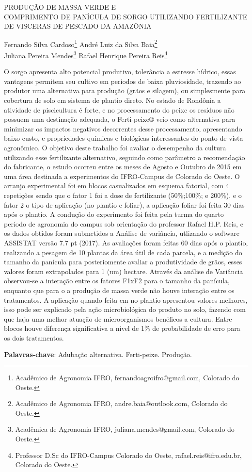 \documentclass[article,12pt,onesidea,4paper,english,brazil]{abntex2}
\begin{document}
	
	
	\frenchspacing 
	
	\begin{center}
		\LARGE PRODUÇÃO DE MASSA VERDE E \\COMPRIMENTO DE PANÍCULA DE SORGO
		UTILIZANDO FERTILIZANTE DE VISCERAS DE PESCADO DA AMAZÔNIA
		
		\normalsize
	Fernando Silva Cardoso\footnote{Acadêmico de Agronomia IFRO, fernandoagroifro@gmail.com, Colorado do Oeste.} 
	André Luiz da Silva Baia\footnote{Acadêmico de Agronomia IFRO, andre.baia@outlook.com, Colorado do Oeste.} \\
	Juliana Pereira Mendes\footnote{Acadêmica de Agronomia IFRO, juliana.mendes@gmail.com, Colorado do Oeste.} 
	Rafael Henrique Pereira Reis\footnote{Professor D.Sc do IFRO-Campus Colorado do Oeste, rafael.reis@ifro.edu.br, Colorado do Oeste.} 
	\end{center}
	
	\noindent O sorgo apresenta alto potencial produtivo, tolerância a estresse hídrico, essas
	vantagens permitem seu cultivo em períodos de baixa pluviosidade, trazendo ao
	produtor uma alternativa para produção (grãos e silagem), ou simplesmente para
	cobertura de solo em sistema de plantio direto. No estado de Rondônia a atividade
	de piscicultura é forte, e no processamento do peixe os resíduos não possuem uma
	destinação adequada, o Ferti-peixe® veio como alternativa para minimizar os
	impactos negativos decorrentes desse processamento, apresentando baixo custo, e
	propriedades químicas e biológicas interessantes do ponto de vista agronômico. O
	objetivo deste trabalho foi avaliar o desempenho da cultura utilizando esse
	fertilizante alternativo, seguindo como parâmetro a recomendação do fabricante, o
	estudo ocorreu entre os meses de Agosto e Outubro de 2015 em uma área
	destinada a experimentos do IFRO-Campus de Colorado do Oeste. O arranjo
	experimental foi em blocos casualizados em esquema fatorial, com 4 repetições
	sendo que o fator 1 foi a dose de fertilizante (50\%;100\%; e 200\%), e o fator 2 o tipo
	de aplicação (no plantio e foliar), a aplicação foliar foi feita 30 dias após o plantio. A
	condução do experimento foi feita pela turma do quarto período de agronomia do
	campus sob orientação do professor Rafael H.P. Reis, e os dados obtidos foram
	submetidos a Análise de variância, utlizando o software ASSISTAT versão 7.7 pt
	(2017). As avaliações foram feitas 60 dias após o plantio, realizando a pesagem de
	10 plantas da área útil de cada parcela, e a medição do tamanho da panícula para
	posteriomente avaliar a produtividade de grãos, esses valores foram extrapolados
	para 1 (um) hectare. Através da análise de Variância observou-se a interação entre
	os fatores F1xF2 para o tamanho da panícula, enquanto que para o a produção de
	massa verde não houve interação entre os tratamentos. A aplicação quando feita em
	no plantio apresentou valores melhores, isso pode ser explicado pela ação
	microbiológica do produto no solo, fazendo com que haja uma melhor atuação de
	microorganismos benéficos a cultura. Entre blocos houve diferença significativa a
	nível de 1\% de probabilidade de erro para os dois tratamentos.
	
	\vspace{\onelineskip}
	
	\noindent
	\textbf{Palavras-chave}: Adubação alternativa. Ferti-peixe. Produção.
	
\end{document}

